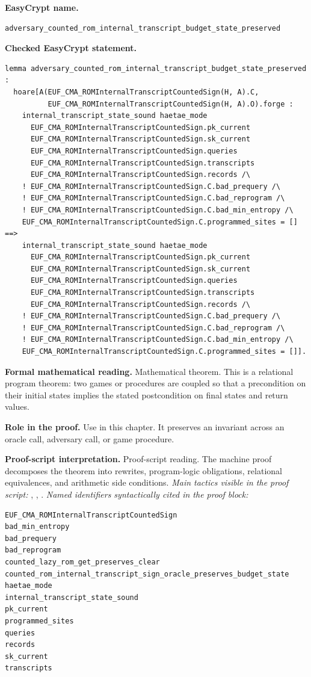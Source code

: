 \begin{formaltheorem}
\noindent\textbf{EasyCrypt name.}
\begin{lstlisting}[language=EasyCrypt,basicstyle=\ttfamily\scriptsize]
adversary_counted_rom_internal_transcript_budget_state_preserved
\end{lstlisting}
\noindent\textbf{Checked EasyCrypt statement.}
\begin{lstlisting}[language=EasyCrypt,basicstyle=\ttfamily\scriptsize]
lemma adversary_counted_rom_internal_transcript_budget_state_preserved :
  hoare[A(EUF_CMA_ROMInternalTranscriptCountedSign(H, A).C,
          EUF_CMA_ROMInternalTranscriptCountedSign(H, A).O).forge :
    internal_transcript_state_sound haetae_mode
      EUF_CMA_ROMInternalTranscriptCountedSign.pk_current
      EUF_CMA_ROMInternalTranscriptCountedSign.sk_current
      EUF_CMA_ROMInternalTranscriptCountedSign.queries
      EUF_CMA_ROMInternalTranscriptCountedSign.transcripts
      EUF_CMA_ROMInternalTranscriptCountedSign.records /\
    ! EUF_CMA_ROMInternalTranscriptCountedSign.C.bad_prequery /\
    ! EUF_CMA_ROMInternalTranscriptCountedSign.C.bad_reprogram /\
    ! EUF_CMA_ROMInternalTranscriptCountedSign.C.bad_min_entropy /\
    EUF_CMA_ROMInternalTranscriptCountedSign.C.programmed_sites = [] ==>
    internal_transcript_state_sound haetae_mode
      EUF_CMA_ROMInternalTranscriptCountedSign.pk_current
      EUF_CMA_ROMInternalTranscriptCountedSign.sk_current
      EUF_CMA_ROMInternalTranscriptCountedSign.queries
      EUF_CMA_ROMInternalTranscriptCountedSign.transcripts
      EUF_CMA_ROMInternalTranscriptCountedSign.records /\
    ! EUF_CMA_ROMInternalTranscriptCountedSign.C.bad_prequery /\
    ! EUF_CMA_ROMInternalTranscriptCountedSign.C.bad_reprogram /\
    ! EUF_CMA_ROMInternalTranscriptCountedSign.C.bad_min_entropy /\
    EUF_CMA_ROMInternalTranscriptCountedSign.C.programmed_sites = []].
\end{lstlisting}
\noindent\textbf{Formal mathematical reading.}
Mathematical theorem. This is a relational program theorem: two games or procedures are coupled so that a precondition on their initial states implies the stated postcondition on final states and return values.

\noindent\textbf{Role in the proof.}
Use in this chapter. It preserves an invariant across an oracle call, adversary call, or game procedure.

\noindent\textbf{Proof-script interpretation.}
Proof-script reading. The machine proof decomposes the theorem into rewrites, program-logic obligations, relational equivalences, and arithmetic side conditions.
\emph{Main tactics visible in the proof script:} , , .
\emph{Named identifiers syntactically cited in the proof block:}
\begin{lstlisting}[language=EasyCrypt,basicstyle=\ttfamily\scriptsize]
EUF_CMA_ROMInternalTranscriptCountedSign
bad_min_entropy
bad_prequery
bad_reprogram
counted_lazy_rom_get_preserves_clear
counted_rom_internal_transcript_sign_oracle_preserves_budget_state
haetae_mode
internal_transcript_state_sound
pk_current
programmed_sites
queries
records
sk_current
transcripts
\end{lstlisting}


\end{formaltheorem}
